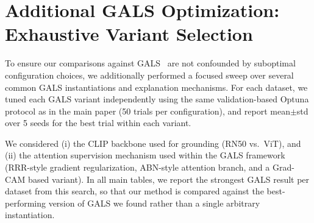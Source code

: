\documentclass[10pt,twocolumn,letterpaper]{article}
\begin{document}





\section{Additional GALS Optimization: Exhaustive Variant Selection}
\label{sec:supp_gals_optuna_variants}

To ensure our comparisons against GALS~\cite{petryk2022guiding} are not confounded by suboptimal configuration choices, we additionally performed a focused sweep over several common GALS instantiations and explanation mechanisms. For each dataset, we tuned each GALS variant independently using the same validation-based Optuna protocol as in the main paper (50 trials per configuration), and report mean$\pm$std over 5 seeds for the best trial within each variant.

We considered (i) the CLIP backbone used for grounding (RN50 vs.\ ViT), and (ii) the attention supervision mechanism used within the GALS framework (RRR-style gradient regularization, ABN-style attention branch, and a Grad-CAM based variant). In all main tables, we report the strongest GALS result per dataset from this search, so that our method is compared against the best-performing version of GALS we found rather than a single arbitrary instantiation.
\end{document}
